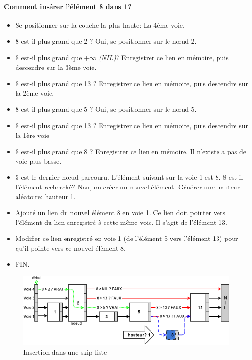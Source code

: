 \documentclass[hidelinks,a4paper, 12pt]{article}
\begin{document}
	\paragraph*{Comment insérer l'élément 8 dans \cref{SkipInsert1}?}
	\begin{itemize}
		\item Se positionner sur la couche la plus haute: La 4ème voie.
		\item 8 est-il plus grand que 2 ? Oui, se positionner sur le nœud 2.
		\item 8 est-il plus grand que $+\infty$ \textit{(NIL)}? Enregistrer ce lien en mémoire, puis descendre sur la 3ème voie.
		\item 8 est-il plus grand que 13  ? Enregistrer ce lien en mémoire, puis descendre sur la 2ème voie.
		\item 8 est-il plus grand que 5 ? Oui, se positionner sur le nœud 5.
		\item 8 est-il plus grand que 13 ? Enregistrer ce lien en mémoire, puis descendre sur la 1ère voie.
		\item 8 est-il plus grand que 8 ? Enregistrer ce lien en mémoire, Il n'existe a pas de voie plus basse.
		\item 5 est le dernier nœud parcouru. L'élément suivant sur la voie 1 est 8. 8 est-il l'élément recherché? Non, on créer un nouvel élément. Générer une hauteur aléatoire: hauteur 1.
		\item Ajouté un lien du nouvel élément 8 en voie 1. Ce lien doit pointer vers l'élément du lien enregistré à cette même voie. Il s'agit de l'élément 13.
		\item Modifier ce lien enregistré en voie 1 (de l'élément 5 vers l'élément 13) pour qu'il pointe vers ce nouvel élément 8.
		\item FIN.
	\end{itemize}
	\begin{figure}[h]
		\includegraphics[width=\textwidth]{img/insert}
		\caption{Insertion dans une skip-liste}
		\label{SkipInsert1}
	\end{figure}
	
\end{document}
